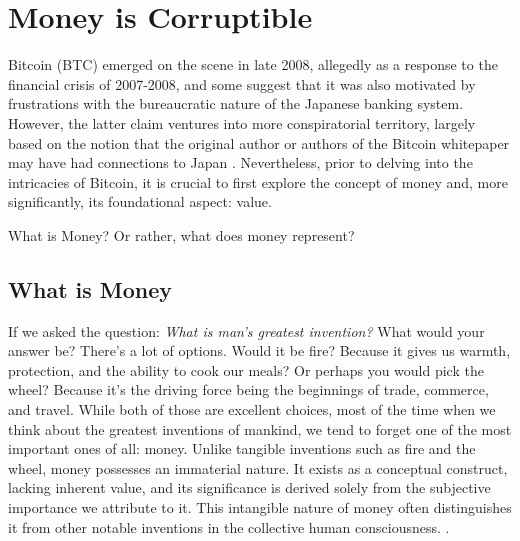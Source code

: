 \section{Money is Corruptible}
Bitcoin (BTC) emerged on the scene in late 2008, allegedly as a response to the financial crisis of 2007-2008, and some suggest that it was also motivated by frustrations with the bureaucratic nature of the Japanese banking system. However, the latter claim ventures into more conspiratorial territory, largely based on the notion that the original author or authors of the Bitcoin whitepaper may have had connections to Japan \cite{nakamoto2008bitcoin}. Nevertheless, prior to delving into the intricacies of Bitcoin, it is crucial to first explore the concept of money and, more significantly, its foundational aspect: value.

What is Money? Or rather, what does money represent?

\subsection{What is Money}
If we asked the question: \textit{What is man's greatest invention?} What would your answer be? There's a lot of options. 
Would it be fire? Because it gives us warmth, protection, and the ability to cook our meals? Or perhaps you would pick the wheel? Because it's the driving
force being the beginnings of trade, commerce, and travel. While both of those are excellent choices, most of the time when we think about the greatest inventions of mankind, we tend to forget one of the most important ones of all: money. Unlike tangible inventions such as fire and the wheel, money possesses an immaterial nature. It exists as a conceptual construct, lacking inherent value, and its significance is derived solely from the subjective importance we attribute to it. This intangible nature of money often distinguishes it from other notable inventions in the collective human consciousness. \cite{smith2010wealth}.


